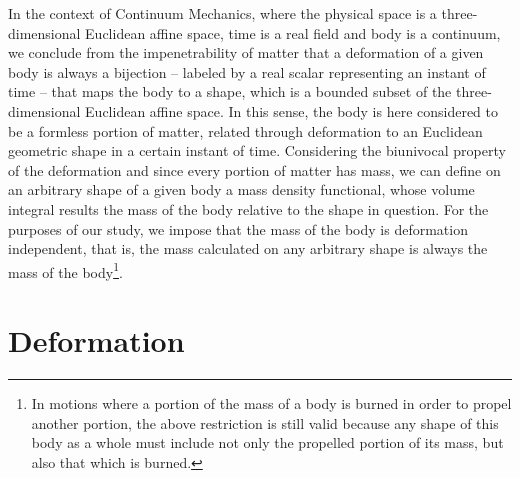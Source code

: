In the context of Continuum Mechanics, where the physical space is a three-dimensional Euclidean affine space, time is a real field and body is a continuum, we conclude from the impenetrability of matter that a deformation of a given body is always a bijection -- labeled by a real scalar representing an instant of time -- that maps the body to a shape, which is a bounded subset of the three-dimensional Euclidean affine space. In this sense, the body is here considered to be a formless portion of matter, related through deformation to an Euclidean geometric shape in a certain instant of time. Considering the biunivocal property of the deformation and since every portion of matter has mass, we can define on an arbitrary shape of a given body a mass density functional, whose volume integral results the mass of the body relative to the shape in question. For the purposes of our study, we impose that the mass of the body is deformation independent, that is, the mass calculated on any arbitrary shape is always the mass of the body\footnote{In motions where a portion of the mass of a body is burned in order to propel another portion, the above restriction is still valid because any shape of this body as a whole must include not only the propelled portion of its mass, but also that which is burned.}.


\section{Deformation}


